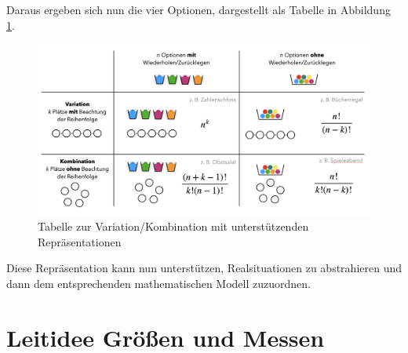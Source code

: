 \documentclass[
]{scrbook}
\theoremstyle{definition}
\theoremstyle{definition}
\theoremstyle{definition}
\theoremstyle{definition}
\theoremstyle{remark}
\begin{document}
Daraus ergeben sich nun die vier Optionen, dargestellt als Tabelle in Abbildung \ref{fig:Kombinatorik}.

\begin{figure}

{\centering \includegraphics[width=0.95\linewidth]{pictures/10-Kombinatorik} 

}

\caption{Tabelle zur Variation/Kombination mit unterstützenden Repräsentationen}\label{fig:Kombinatorik}
\end{figure}

Diese Repräsentation kann nun unterstützen, Realsituationen zu abstrahieren und dann dem entsprechenden mathematischen Modell zuzuordnen.

\hypertarget{leitidee-gruxf6uxdfen-und-messen}{%
\chapter{Leitidee Größen und Messen}\label{leitidee-gruxf6uxdfen-und-messen}}
\end{document}
